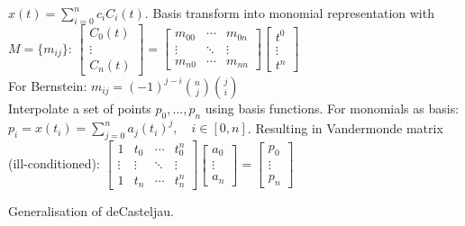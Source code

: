  $x(t) = \sum_{i=0}^nc_iC_i(t)$. Basis transform into monomial representation with $M=\{m_{ij}\}$:
$
\begin{bmatrix}
        
C_0(t) \\
\vdots \\
C_n(t)

\end{bmatrix}
=
\begin{bmatrix}
        m_{00} & \cdots & m_{0n} \\
\vdots & \ddots & \vdots \\
m_{n0} & \cdots & m_{nn}
\end{bmatrix}
\begin{bmatrix}
        
t^0 \\
\vdots \\
t^n   
\end{bmatrix}
$
\\
For Bernstein: $m_{ij} = (-1)^{j-i} \binom{n}{j} \binom{j}{i}$
\\
 Interpolate a set of points $p_0, ..., p_n$ using basis functions. For monomials as basis: $p_i = x(t_i) = \sum_{j=0}^{n} a_j(t_i)^j, \quad i \in [0,n]$. Resulting in Vandermonde matrix (ill-conditioned): 
$
\begin{bmatrix}
        
1 & t_0 & \cdots & t_0^n \\
\vdots & \vdots & \ddots & \vdots \\
1 & t_n & \cdots & t_n^n

\end{bmatrix}
\begin{bmatrix}
        
a_0 \\
\vdots \\
a_n

\end{bmatrix}
=
\begin{bmatrix}
        
p_0 \\
\vdots \\
p_n
\end{bmatrix}
$

 Generalisation of deCasteljau.
